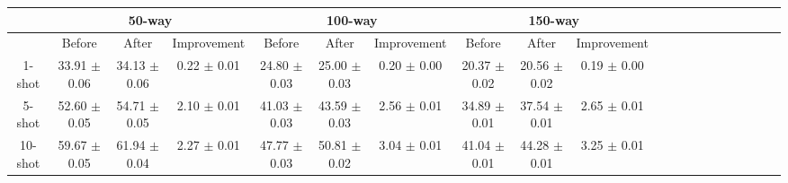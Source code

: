 \begin{tabular}{|c|c|c|c|c|c|c|c|c|c|c|c|c|c|c|c|c|c|c|c}
\toprule
        & \multicolumn{3}{c|}{50-way} & \multicolumn{3}{c|}{100-way} & \multicolumn{3}{c|}{150-way} \\\midrule
        &          Before &           After &    Improvement &          Before &           After &    Improvement &          Before &           After &    Improvement \\\midrule
\midrule
1-shot &  33.91 $\pm$ 0.06 &  34.13 $\pm$ 0.06 &  0.22 $\pm$ 0.01 &  24.80 $\pm$ 0.03 &  25.00 $\pm$ 0.03 &  0.20 $\pm$ 0.00 &  20.37 $\pm$ 0.02 &  20.56 $\pm$ 0.02 &  0.19 $\pm$ 0.00 \\\midrule
5-shot &  52.60 $\pm$ 0.05 &  54.71 $\pm$ 0.05 &  2.10 $\pm$ 0.01 &  41.03 $\pm$ 0.03 &  43.59 $\pm$ 0.03 &  2.56 $\pm$ 0.01 &  34.89 $\pm$ 0.01 &  37.54 $\pm$ 0.01 &  2.65 $\pm$ 0.01 \\\midrule
10-shot &  59.67 $\pm$ 0.05 &  61.94 $\pm$ 0.04 &  2.27 $\pm$ 0.01 &  47.77 $\pm$ 0.03 &  50.81 $\pm$ 0.02 &  3.04 $\pm$ 0.01 &  41.04 $\pm$ 0.01 &  44.28 $\pm$ 0.01 &  3.25 $\pm$ 0.01 \\\midrule
\bottomrule
\end{tabular}

